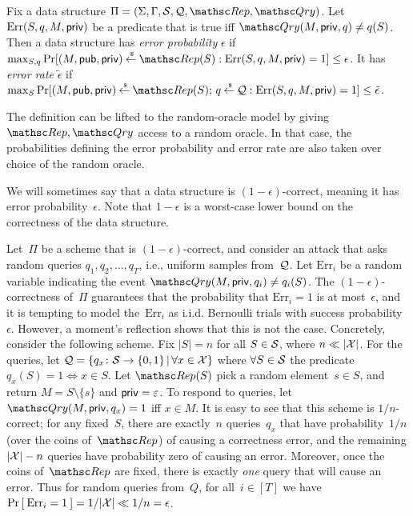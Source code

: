 \begin{definition} \rm
Fix a data structure $\setprim=(\Sigma,\Gamma,\calS,\calQ,\Rep,
\Qry)$. Let $\mathrm{Err}(S,q,M,{\sf priv})$ be a predicate that is
true iff $\Qry(M, \privaux, q) \neq q(S)$.  Then a data structure
has \emph{error probability} $\epsilon$ if
$\max_{S,q}\Pr[(M,\pubaux,\privaux) \getsr \Rep(S) :
\mathrm{Err}(S,q,M,\privaux)=1 ] \leq \epsilon$.
%
It has \emph{error rate} $\tilde{\epsilon}$ if
$\max_{S}\Pr[(M,\pubaux,\privaux) \getsr \Rep(S);\, q \getsr \calQ :
\mathrm{Err}(S,q,M,\privaux)=1] \leq \tilde{\epsilon}$. \hfill\dqed
\end{definition}

\noindent The definition can be lifted to the random-oracle model by
giving $\Rep, \Qry$ access to a random oracle. In that case, the
probabilities defining the error probability and error rate are also
taken over choice of the random oracle.

We will sometimes say that a data structure is
$(1-\epsilon)$-correct, meaning it has error probability~$\epsilon$.
Note that $1-\epsilon$ is a worst-case lower bound on the
correctness of the data structure.


\def\bin{{\sf Bin}}
Let~$\Pi$ be a scheme that is $(1-\epsilon)$-correct, and consider
an attack that asks random queries $q_1,q_2,\ldots,q_T$, i.e.,
uniform samples from~${\cal Q}$.
Let $\mathrm{Err}_i$ be a random variable indicating the event $\Qry(M,\privaux,q_i)\neq q_i(S)$.
The $(1-\epsilon)$-correctness of~$\Pi$ guarantees that the probability that $\mathrm{Err}_i=1$ is at most~$\epsilon$,
and it is tempting to model the~$\mathrm{Err}_i$ as i.i.d. Bernoulli trials with success probability~$\epsilon$.
However, a moment's reflection shows that this is not the case.  Concretely, consider the following scheme.  Fix $|S|=n$ for all $S \in {\cal S}$, where $n \ll |{\cal X}|$.  For the queries, let ${\cal Q} = \{q_x\colon {\cal S} \to \{0,1\} \,|\, \forall x \in {\cal X}\}$ where $\forall S \in {\cal S}$ the predicate $q_x(S)=1 \Leftrightarrow x \in S$.  Let $\Rep(S)$ pick a random element~$s \in S$, and return $M = S \setminus \{s\}$ and ${\sf priv} = \varepsilon$.  To respond to queries, let~$\Qry(M,\privaux,q_x)=1$ iff $x \in M$.  It is easy to see that this scheme is $1/n$-correct; for any fixed~$S$, there are exactly~$n$ queries~$q_x$ that have probability~$1/n$  (over the coins of~$\Rep$) of causing a correctness error, and the remaining $|{\cal X}|-n$ queries have probability zero of causing an error.  Moreover, once the coins of~$\Rep$ are fixed, there is exactly \emph{one} query that will cause an error.  Thus for random queries from~$Q$, for all~$i\in[T]$ we have $\Pr\left[\: \mathrm{Err}_i=1 \:\right]=1/|{\cal X}| \ll 1/n = \epsilon$.

